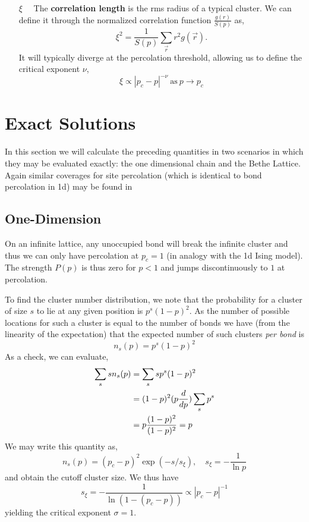 \begin{enumerate}
\item[$\xi\quad$] The \textbf{correlation length} is the rms radius of a typical
cluster.  We can define it through the normalized correlation function
$\frac{g(r)}{S(p)}$ as,
\[\xi^2 = \frac{1}{S(p)}\sum_{\vec{r}}r^2 g(\vec{r}).\]
It will typically diverge at the percolation threshold,
allowing us to define the critical exponent $\nu$,
\[ \xi \propto |p_c - p|^{-\nu} \ \text{as}\ p\to p_c \]
\end{enumerate}


\section{Exact Solutions}

In this section we will calculate the preceding quantities in two scenarios in which they
may be evaluated exactly: the one dimensional chain and the Bethe Lattice.  Again
similar coverages for site percolation (which is identical to bond percolation in 1d)
may be found in \cite{Stauffer1994} \cite{Christensen2002}

\subsection{One-Dimension}

On an infinite lattice, any unoccupied bond will break the infinite cluster and thus
we can only have percolation at $p_c = 1$ (in analogy with the 1d Ising model).  The
strength $P(p)$ is thus zero for $p<1$ and jumps discontinuously to $1$ at percolation.

To find the cluster number distribution, we note that the probability for a cluster
of size $s$ to lie at any given position is $p^s(1-p)^2$.  As the number of possible
locations for such a cluster is equal to the number of bonds we have (from the linearity
of the expectation) that the expected number of such clusters \emph{per bond} is
\[n_s(p) = p^s(1-p)^2\]
As a check, we can evaluate,
\begin{align*}
\sum_s sn_s(p) &= \sum_s sp^s(1-p)^2 \\
 &= (1-p)^2 (p\frac{d }{d p})\sum_s p^s \\
 &= p\frac{(1-p)^2}{(1-p)^2} = p
\end{align*}
We may write this
quantity as,
\[n_s(p) = (p_c - p)^2\exp{(-s/s_\xi)}, \quad s_\xi = -\frac{1}{\ln{p}}\]
and obtain the cutoff cluster size.  We thus have
\[s_\xi = -\frac{1}{\ln(1 - (p_c - p))}\propto |p_c - p|^{-1}\]
yielding the critical exponent $\sigma=1$.

